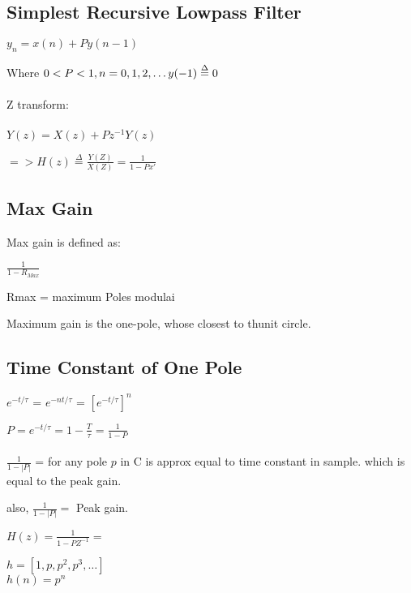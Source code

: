 

\subsection*{Simplest Recursive Lowpass Filter}

$y_n = x(n) + Py(n-1)$

Where $0 < P < 1, \\ 
n = 0, 1, 2, \dots
y(-1) \stackrel{\Delta}{=} 0
$\\\\
Z transform:\\\\
$Y(z) = X(z) + Pz^{-1}Y(z)$

$=> H(z) \stackrel{\Delta}{=} \frac{Y(Z)}{X(Z)}
= \frac{1}{1 - Px'}
$
\\



\subsection*{Max Gain}

Max gain is defined as:

$\frac{1}{1 - R_{Max}}$

Rmax = maximum Poles modulai  %

Maximum gain is the one-pole, whose closest to thunit circle.


\subsection*{Time Constant of One Pole}

$e^{-t/\tau}$ =
$e^{-nt/\tau}$  =
$[e^{-t/\tau}]^n$ 

$
P = e^{-t/\tau}
= 1- \frac{T}{\tau} %
= \frac{1}{1 - P} %
$\\\\

$
\frac{1}{1 - |P|}
$ 
= for any pole $p$ in C is approx equal to time constant in sample.
which is equal to the peak gain.


also,
$
\frac{1}{1 - |P|} =
$ 
Peak gain.

$
H(z) = \frac{1}{1 - PZ^{-1}} =
$ 

$h = [1, p, p^2, p^3, \dots]$\\
$h(n) = p^n$


